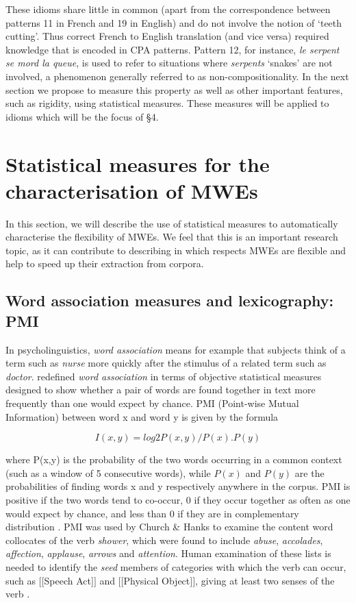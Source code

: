\documentclass[output=paper]{langsci/langscibook}
\begin{document}
These idioms share little in common (apart from the correspondence
between patterns 11 in French and 19 in English) and do not involve the
notion of `teeth cutting'. Thus correct French to English translation
(and vice versa) required knowledge that is encoded in CPA patterns.
Pattern 12, for instance, \textit{le serpent se mord la queue}, is used to
refer to situations where \textit{serpents} ‘snakes’ are not involved, a
phenomenon generally referred to as non-compositionality. In the next
section we propose to measure this property as well as other important
features, such as rigidity, using statistical measures. These measures
will be applied to idioms which will be the focus of  §4.




\section{Statistical measures for the characterisation of MWEs}

In this section, we will describe the use of statistical measures to
automatically characterise the flexibility of MWEs. We feel that this
is an important research topic, as it can contribute to describing in
which respects MWEs are flexible and help to speed up their extraction
from corpora.


\subsection{Word association measures and lexicography: PMI}

In psycholinguistics, \textit{word association} means for example that subjects
think of a term such as \textit{nurse} more quickly after the stimulus of a
related term such as \textit{doctor}. \cite{church1989}  redefined \textit{word
association} in terms of objective statistical measures designed to
show whether a pair of words are found together in text more frequently
than one would expect by chance.  PMI (Point-wise Mutual Information)
between word x and word y is given by the formula


\begin{equation*}
I(x,y)=\mathit{log2}P(x,y)/P(x).P(y)
\end{equation*}


\noindent  where P(x,y) is the probability of the two words occurring in a common
context (such as a window of 5 consecutive words), while $P(x)$ and $P(y)$
are the probabilities of finding words x and y respectively anywhere in
the corpus. PMI is positive if the two words tend to co-occur, 0 if
they occur together as often as one would expect by chance, and less
than 0 if they are in complementary distribution \citep{church1989}.  PMI was used by Church \& Hanks to examine the content word
collocates of the verb \textit{shower}, which were found to include \textit{abuse},
\textit{accolades}, \textit{affection}, \textit{applause}, \textit{arrows} and \textit{attention}. Human
examination of these lists is needed to identify the \textit{seed} members of
categories with which the verb can occur, such as $[$$[$Speech Act$]$$]$ and
$[$$[$Physical Object$]$$]$, giving at least two senses of the verb \citep{hanks2012}. 
\end{document}
